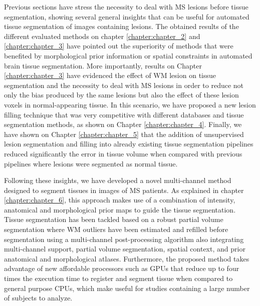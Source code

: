 Previous sections have stress the necessity to deal with MS lesions before tissue segmentation, showing several general insights that can be useful for automated tissue segmentation of images containing lesions. The obtained results of the different evaluated methods on chapter \ref{chapter:chapter_2} and \ref{chapter:chapter_3} have pointed out the superiority of methods that were benefited by morphological prior information or spatial constraints in automated brain tissue segmentation. More importantly, results on Chapter \ref{chapter:chapter_3} have evidenced the effect of WM lesion on tissue segmentation and the necessity to deal with MS lesions in order to reduce not only the bias produced by the same lesions but also the effect of these lesion voxels in normal-appearing tissue. In this scenario, we have proposed a new lesion filling technique that was very competitive with different databases and tissue segmentation methods, as shown on Chapter \ref{chapter:chapter_4}. Finally, we have shown on Chapter \ref{chapter:chapter_5} that the addition of unsupervised lesion segmentation and filling into already existing tissue segmentation pipelines reduced significantly the error in tissue volume when compared with previous pipelines where lesions were segmented as normal tissue. 

Following these insights, we have developed a novel multi-channel method designed to segment tissues in images of MS patients. As explained in chapter \ref{chapter:chapter_6}, this approach makes use of a combination of intensity, anatomical and morphological prior maps to guide the tissue segmentation. Tissue segmentation has been tackled based on a robust partial volume segmentation where WM outliers have been estimated and refilled before segmentation using a multi-channel post-processing algorithm also integrating multi-channel support, partial volume segmentation, spatial context, and prior anatomical and morphological atlases. Furthermore, the proposed method takes advantage of new affordable processors such as GPUs that reduce up to four times the execution time to register and segment tissue when compared to general purpose CPUs, which make useful for studies containing a large number of subjects to analyze.   

